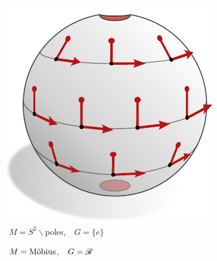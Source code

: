 \hfill
\begin{subfigure}[b]{0.26\textwidth}
    \centering
    \includegraphics[width=.95\textwidth]{figures/G_structure_S2_2.pdf}
    \vspace*{-2ex}
    \captionsetup{format=hang}
    \caption{\small
        \,  $M = S^2\backslash$poles,
        \,\ $G = \{e\}$
   }
    \label{fig:G_structure_intro_k}
\end{subfigure}
\hfill
\begin{subfigure}[b]{0.26\textwidth}
    \centering
    \vspace*{-3.ex}
    \captionsetup{format=hang}
    \caption{\small
        \,  $M = \textup{M\"obius}$,
        \,\ $G = \mathscr{R}$
    }
    \label{fig:G_structure_intro_l}
\end{subfigure}
